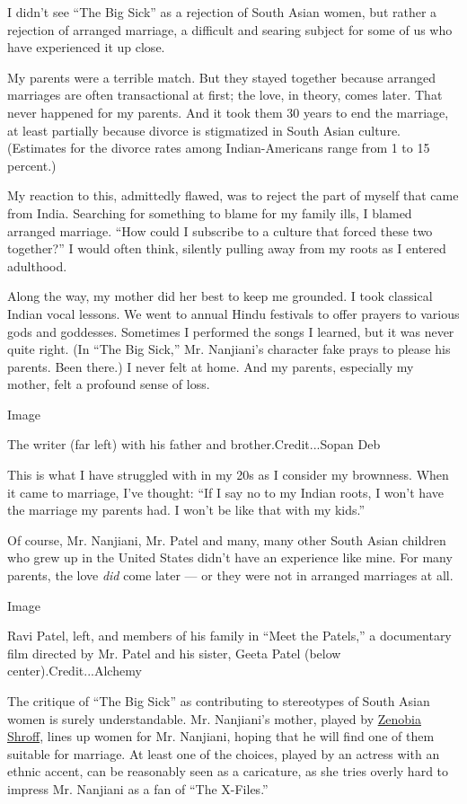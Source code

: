 I didn't see ``The Big Sick'' as a rejection of South Asian women, but
rather a rejection of arranged marriage, a difficult and searing subject
for some of us who have experienced it up close.

My parents were a terrible match. But they stayed together because
arranged marriages are often transactional at first; the love, in
theory, comes later. That never happened for my parents. And it took
them 30 years to end the marriage, at least partially because divorce is
stigmatized in South Asian culture. (Estimates for the divorce rates
among Indian-Americans range from 1 to 15 percent.)

My reaction to this, admittedly flawed, was to reject the part of myself
that came from India. Searching for something to blame for my family
ills, I blamed arranged marriage. ``How could I subscribe to a culture
that forced these two together?'' I would often think, silently pulling
away from my roots as I entered adulthood.

Along the way, my mother did her best to keep me grounded. I took
classical Indian vocal lessons. We went to annual Hindu festivals to
offer prayers to various gods and goddesses. Sometimes I performed the
songs I learned, but it was never quite right. (In ``The Big Sick,'' Mr.
Nanjiani's character fake prays to please his parents. Been there.) I
never felt at home. And my parents, especially my mother, felt a
profound sense of loss.

Image

The writer (far left) with his father and brother.Credit...Sopan Deb

This is what I have struggled with in my 20s as I consider my brownness.
When it came to marriage, I've thought: ``If I say no to my Indian
roots, I won't have the marriage my parents had. I won't be like that
with my kids.''

Of course, Mr. Nanjiani, Mr. Patel and many, many other South Asian
children who grew up in the United States didn't have an experience like
mine. For many parents, the love \emph{did} come later --- or they were
not in arranged marriages at all.

Image

Ravi Patel, left, and members of his family in ``Meet the Patels,'' a
documentary film directed by Mr. Patel and his sister, Geeta Patel
(below center).Credit...Alchemy

The critique of ``The Big Sick'' as contributing to stereotypes of South
Asian women is surely understandable. Mr. Nanjiani's mother, played by
\href{http://www.imdb.com/name/nm2801210/?ref_=tt_cl_t6}{Zenobia
Shroff}, lines up women for Mr. Nanjiani, hoping that he will find one
of them suitable for marriage. At least one of the choices, played by an
actress with an ethnic accent, can be reasonably seen as a caricature,
as she tries overly hard to impress Mr. Nanjiani as a fan of ``The
X-Files.''

